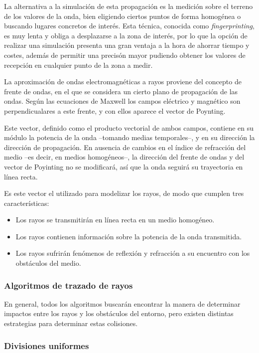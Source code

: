 La alternativa a la simulación de esta propagación es la medición sobre el terreno de los valores de la onda, bien eligiendo ciertos puntos de forma homogénea o buscando lugares concretos de interés.
Esta técnica, conocida como \textit{fingerprinting}, es muy lenta y obliga a desplazarse a la zona de interés, por lo que la opción de realizar una simulación presenta una gran ventaja a la hora de ahorrar tiempo y costes, además de permitir una precisón mayor pudiendo obtener los valores de recepción en cualquier punto de la zona a medir.

La aproximación de ondas electromagnéticas a rayos proviene del concepto de frente de ondas, en el que se considera un cierto plano de propagación de las ondas.
Según las ecuaciones de Maxwell los campos eléctrico y magnético son perpendicualares a este frente, y con ellos aparece el vector de Poynting.

Este vector, definido como el producto vectorial de ambos campos, contiene en su módulo la potencia de la onda --tomando medias temporales--, y en su dirección la dirección de propagación.
En ausencia de cambios en el índice de refracción del medio --es decir, en medios homogéneos--, la dirección del frente de ondas y del vector de Poyinting no se modificará, así que la onda seguirá su trayectoria en línea recta.

Es este vector el utilizado para modelizar los rayos, de modo que cumplen tres características:
\begin{itemize}
    \item Los rayos se transmitirán en línea recta en un medio homogéneo.
    \item Los rayos contienen información sobre la potencia de la onda transmitida.
    \item Los rayos sufrirán fenómenos de reflexión y refracción a su encuentro con los obstáculos del medio.
\end{itemize}

\subsubsection{Algoritmos de trazado de rayos}

En general, todos los algoritmos buscarán encontrar la manera de determinar impactos entre los rayos y los obstáculos del entorno, pero existen distintas estrategias para determinar estas colisiones.

\subsubsection*{Divisiones uniformes}

